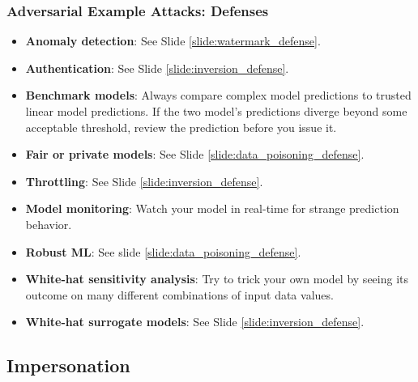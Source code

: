 \documentclass[11pt,
               aspectratio=169,
               hyperref={colorlinks}
               ]{beamer}
\begin{document}
			\begin{frame}
		
				\frametitle{Adversarial Example Attacks: \textbf{Defenses}}		
				\footnotesize
				\begin{itemize}
					\item \textbf{Anomaly detection}: See Slide \ref{slide:watermark_defense}. 
					\item \textbf{Authentication}: See Slide \ref{slide:inversion_defense}. 
					\item \textbf{Benchmark models}: Always compare complex model predictions to trusted linear model predictions. If the two model’s predictions diverge beyond some acceptable threshold, review the prediction before you issue it.
					\item \textbf{Fair or private models}: See Slide \ref{slide:data_poisoning_defense}.
					\item \textbf{Throttling}: See Slide \ref{slide:inversion_defense}. 
					\item \textbf{Model monitoring}: Watch your model in real-time for strange prediction behavior.
					\item \textbf{Robust ML}: See slide \ref{slide:data_poisoning_defense}.
					\item \textbf{White-hat sensitivity analysis}: Try to trick your own model by seeing its outcome on many different combinations of input data values.
					\item \textbf{White-hat surrogate models}: See Slide \ref{slide:inversion_defense}. 
				\end{itemize}
				\normalsize
			\end{frame}

		\subsection{Impersonation}
\end{document}

